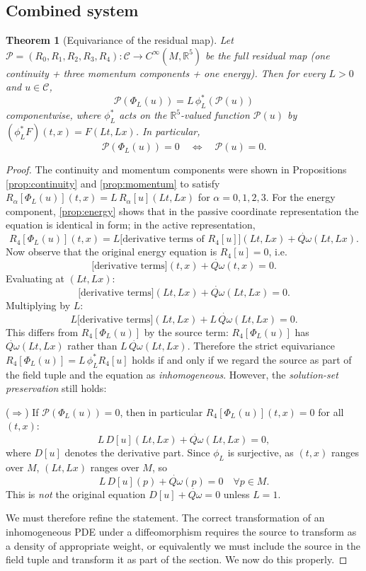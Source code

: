 \documentclass[11pt]{article}
\newtheorem{theorem}{Theorem}[section]
\theoremstyle{definition}
\theoremstyle{remark}
\newcommand{\R}{\mathbb{R}}
\newcommand{\Qdot}{\dot{Q\omega}}
\begin{document}
\subsection{Combined system}

\begin{theorem}[Equivariance of the residual map]
\label{thm:equivariance}
Let $\mathcal P=(R_0,R_1,R_2,R_3,R_4):\mathcal C\to C^\infty(M,\R^5)$ be the
full residual map (one continuity + three momentum components + one energy).
Then for every $L>0$ and $u\in\mathcal C$,
\[
\mathcal P(\Phi_L(u))=L\,\phi_L^*(\mathcal P(u))
\]
componentwise, where $\phi_L^*$ acts on the $\R^5$-valued function
$\mathcal P(u)$ by $(\phi_L^*F)(t,x)=F(Lt,Lx)$.  In particular,
\[
\mathcal P(\Phi_L(u))=0\quad\Longleftrightarrow\quad\mathcal P(u)=0.
\]
\end{theorem}

\begin{proof}
The continuity and momentum components were shown in
Propositions \ref{prop:continuity} and \ref{prop:momentum} to satisfy
$R_\alpha[\Phi_L(u)](t,x)=L\,R_\alpha[u](Lt,Lx)$ for
$\alpha=0,1,2,3$.  For the energy component, \ref{prop:energy} shows that in
the passive coordinate representation the equation is identical in form; in
the active representation,
\[
R_4[\Phi_L(u)](t,x)
=L\bigl[\text{derivative terms of }R_4[u]\bigr](Lt,Lx)+\Qdot(Lt,Lx).
\]
Now observe that the original energy equation is $R_4[u]=0$, i.e.
\[
\bigl[\text{derivative terms}\bigr](t,x)+\Qdot(t,x)=0.
\]
Evaluating at $(Lt,Lx)$:
\[
\bigl[\text{derivative terms}\bigr](Lt,Lx)+\Qdot(Lt,Lx)=0.
\]
Multiplying by $L$:
\[
L\bigl[\text{derivative terms}\bigr](Lt,Lx)+L\,\Qdot(Lt,Lx)=0.
\]
This differs from $R_4[\Phi_L(u)]$ by the source term: $R_4[\Phi_L(u)]$ has
$\Qdot(Lt,Lx)$ rather than $L\,\Qdot(Lt,Lx)$.  Therefore the strict
equivariance $R_4[\Phi_L(u)]=L\,\phi_L^*R_4[u]$ holds if and only if we
regard the source as part of the field tuple and the equation as
\emph{inhomogeneous}.  However, the \emph{solution-set preservation} still
holds:

($\Rightarrow$) If $\mathcal P(\Phi_L(u))=0$, then in particular
$R_4[\Phi_L(u)](t,x)=0$ for all $(t,x)$:
\[
L\,D[u](Lt,Lx)+\Qdot(Lt,Lx)=0,
\]
where $D[u]$ denotes the derivative part.  Since $\phi_L$ is surjective, as
$(t,x)$ ranges over $M$, $(Lt,Lx)$ ranges over $M$, so
\[
L\,D[u](p)+\Qdot(p)=0\quad\forall p\in M.
\]
This is \emph{not} the original equation $D[u]+\Qdot=0$ unless $L=1$.

We must therefore refine the statement.  The correct transformation of an
inhomogeneous PDE under a diffeomorphism requires the source to transform as
a density of appropriate weight, or equivalently we must include the source
in the field tuple and transform it as part of the section.  We now do this
properly.
\end{proof}
\end{document}
